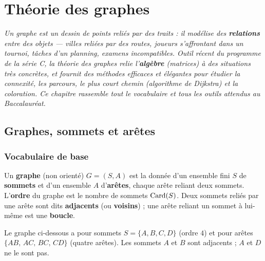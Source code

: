 \chapter{Théorie des graphes}

\noindent\textit{Un graphe est un dessin de points reliés par des traits : il modélise
des \textbf{relations} entre des objets — villes reliées par des routes, joueurs s'affrontant
dans un tournoi, tâches d'un planning, examens incompatibles. Outil récent du programme de la
série C, la théorie des graphes relie l'\textbf{algèbre} (matrices) à des situations très
concrètes, et fournit des méthodes efficaces et élégantes pour étudier la connexité, les
parcours, le plus court chemin (algorithme de Dijkstra) et la coloration. Ce chapitre rassemble
tout le vocabulaire et tous les outils attendus au Baccalauréat.}
\vspace{8pt}

\section{Graphes, sommets et arêtes}

\subsection{Vocabulaire de base}

\begin{definition}
Un \textbf{graphe} (non orienté) $G=(S,A)$ est la donnée d'un ensemble fini $S$ de
\textbf{sommets} et d'un ensemble $A$ d'\textbf{arêtes}, chaque arête reliant deux sommets.
L'\textbf{ordre} du graphe est le nombre de sommets $\operatorname{Card}(S)$. Deux sommets reliés par une
arête sont dits \textbf{adjacents} (ou \textbf{voisins}) ; une arête reliant un sommet à
lui-même est une \textbf{boucle}.
\end{definition}

\begin{exemple}
Le graphe ci-dessous a pour sommets $S=\{A,B,C,D\}$ (ordre $4$) et pour arêtes
$\{AB,\,AC,\,BC,\,CD\}$ (quatre arêtes). Les sommets $A$ et $B$ sont adjacents ; $A$ et $D$
ne le sont pas.
\end{exemple}

